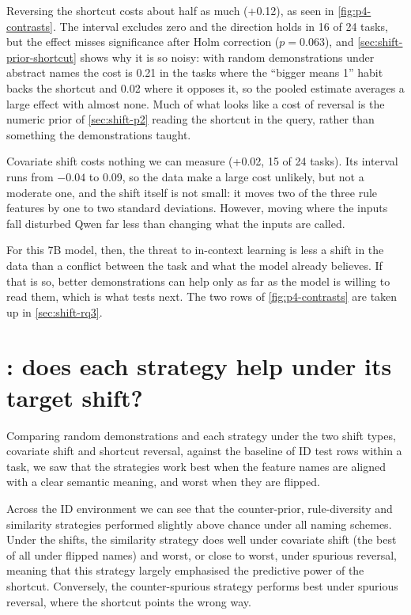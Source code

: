Reversing the shortcut costs about half as much (+0.12), as seen in \autoref{fig:p4-contrasts}. The interval excludes zero and the direction holds in 16 of 24 tasks, but the effect misses significance after Holm correction ($p = 0.063$), and \autoref{sec:shift-prior-shortcut} shows why it is so noisy: with random demonstrations under abstract names the cost is 0.21 in the tasks where the ``bigger means 1'' habit backs the shortcut and 0.02 where it opposes it, so the pooled estimate averages a large effect with almost none. Much of what looks like a cost of reversal is the numeric prior of \autoref{sec:shift-p2} reading the shortcut in the query, rather than something the demonstrations taught.

Covariate shift costs nothing we can measure (+0.02, 15 of 24 tasks). Its interval runs from $-0.04$ to 0.09, so the data make a large cost unlikely, but not a moderate one, and the shift itself is not small: it moves two of the three rule features by one to two standard deviations. However, moving where the inputs fall disturbed Qwen far less than changing what the inputs are called.

For this 7B model, then, the threat to in-context learning is less a shift in the data than a conflict between the task and what the model already believes. If that is so, better demonstrations can help only as far as the model is willing to read them, which is what  tests next. The two  rows of \autoref{fig:p4-contrasts} are taken up in \autoref{sec:shift-rq3}.

\section{: does each strategy help under its target shift?}
\label{sec:shift-rq2}


Comparing random demonstrations and each strategy under the two shift types, covariate shift and shortcut reversal, against the baseline of ID test rows within a task, we saw that the strategies work best when the feature names are aligned with a clear semantic meaning, and worst when they are flipped.

Across the ID environment we can see that the counter-prior, rule-diversity and similarity strategies performed slightly above chance under all naming schemes. Under the shifts, the similarity strategy does well under covariate shift (the best of all under flipped names) and worst, or close to worst, under spurious reversal, meaning that this strategy largely emphasised the predictive power of the shortcut. Conversely, the counter-spurious strategy performs best under spurious reversal, where the shortcut points the wrong way.

